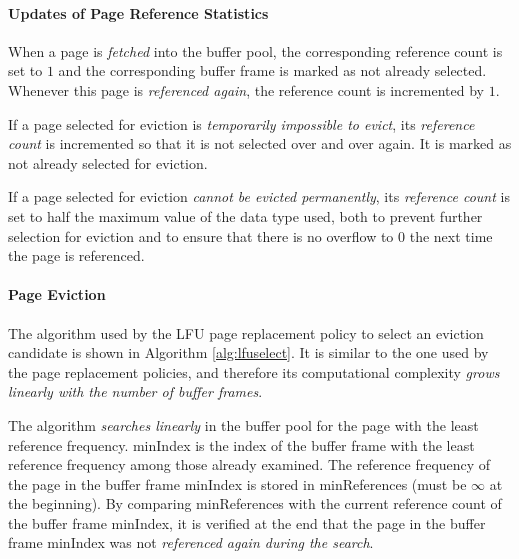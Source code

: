 \paragraph{Updates of Page Reference Statistics}

    When a page is \emph{fetched} into the buffer pool, the corresponding reference count is set to $1$ and the corresponding buffer frame is marked as not already selected. Whenever this page is \emph{referenced again}, the reference count is incremented by $1$.

    If a page selected for eviction is \emph{temporarily impossible to evict}, its \textit{reference count} is incremented so that it is not selected over and over again. It is marked as not already selected for eviction.

    If a page selected for eviction \emph{cannot be evicted permanently}, its \textit{reference count} is set to half the maximum value of the data type used, both to prevent further selection for eviction and to ensure that there is no overflow to $0$ the next time the page is referenced.

\paragraph{Page Eviction}

    The algorithm used by the LFU page replacement policy to select an eviction candidate is shown in Algorithm \ref{alg:lfuselect}. It is similar to the one used by the  page replacement policies, and therefore its computational complexity \emph{grows linearly with the number of buffer frames}.

    The algorithm \emph{searches linearly} in the buffer pool for the page with the least reference frequency. {\scriptsize minIndex} is the index of the buffer frame with the least reference frequency among those already examined. The reference frequency of the page in the buffer frame {\scriptsize minIndex} is stored in {\scriptsize minReferences} (must be $\infty$ at the beginning). By comparing {\scriptsize minReferences} with the current reference count of the buffer frame {\scriptsize minIndex}, it is verified at the end that the page in the buffer frame {\scriptsize minIndex} was not \emph{referenced again during the search}.

